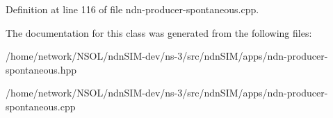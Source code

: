 Definition at line 116 of file ndn-\/producer-\/spontaneous.\+cpp.



The documentation for this class was generated from the following files\+:\begin{DoxyCompactItemize}
\item 
/home/network/\+N\+S\+O\+L/ndn\+S\+I\+M-\/dev/ns-\/3/src/ndn\+S\+I\+M/apps/ndn-\/producer-\/spontaneous.\+hpp\item 
/home/network/\+N\+S\+O\+L/ndn\+S\+I\+M-\/dev/ns-\/3/src/ndn\+S\+I\+M/apps/ndn-\/producer-\/spontaneous.\+cpp\end{DoxyCompactItemize}
